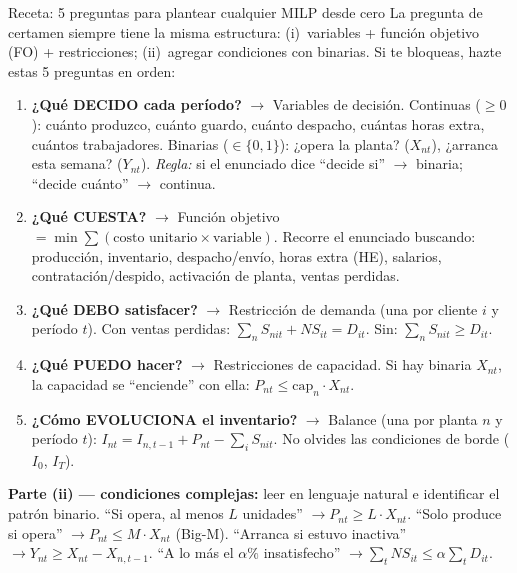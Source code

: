 \begin{tipprueba}{Receta: 5 preguntas para plantear cualquier MILP desde cero}
La pregunta de certamen siempre tiene la misma estructura: (i)~variables + función objetivo (FO) + restricciones; (ii)~agregar condiciones con binarias. Si te bloqueas, hazte estas 5 preguntas en orden:
\begin{enumerate}[leftmargin=1.5em, itemsep=3pt]
  \item \textbf{¿Qué DECIDO cada período?} $\to$ Variables de decisión.
    Continuas ($\ge 0$): cuánto produzco, cuánto guardo, cuánto despacho, cuántas horas extra, cuántos trabajadores.
    Binarias ($\in\{0,1\}$): ¿opera la planta? ($X_{nt}$), ¿arranca esta semana? ($Y_{nt}$).
    \textit{Regla:} si el enunciado dice ``decide si'' $\to$ binaria; ``decide cuánto'' $\to$ continua.
  \item \textbf{¿Qué CUESTA?} $\to$ Función objetivo $= \min \sum (\text{costo unitario} \times \text{variable})$.
    Recorre el enunciado buscando: producción, inventario, despacho/envío, horas extra (HE), salarios, contratación/despido, activación de planta, ventas perdidas.
  \item \textbf{¿Qué DEBO satisfacer?} $\to$ Restricción de demanda (una por cliente $i$ y período $t$).
    Con ventas perdidas: $\sum_n S_{nit} + NS_{it} = D_{it}$. Sin: $\sum_n S_{nit} \ge D_{it}$.
  \item \textbf{¿Qué PUEDO hacer?} $\to$ Restricciones de capacidad.
    Si hay binaria $X_{nt}$, la capacidad se ``enciende'' con ella: $P_{nt} \le \text{cap}_n \cdot X_{nt}$.
  \item \textbf{¿Cómo EVOLUCIONA el inventario?} $\to$ Balance (una por planta $n$ y período $t$):
    $I_{nt} = I_{n,t-1} + P_{nt} - \sum_i S_{nit}$. No olvides las condiciones de borde ($I_0$, $I_T$).
\end{enumerate}
\textbf{Parte (ii) --- condiciones complejas:} leer en lenguaje natural e identificar el patrón binario.
``Si opera, al menos $L$ unidades'' $\to P_{nt} \ge L \cdot X_{nt}$.
``Solo produce si opera'' $\to P_{nt} \le M \cdot X_{nt}$ (Big-M).
``Arranca si estuvo inactiva'' $\to Y_{nt} \ge X_{nt} - X_{n,t-1}$.
``A lo más el $\alpha\%$ insatisfecho'' $\to \sum_t NS_{it} \le \alpha \sum_t D_{it}$.
\end{tipprueba}

